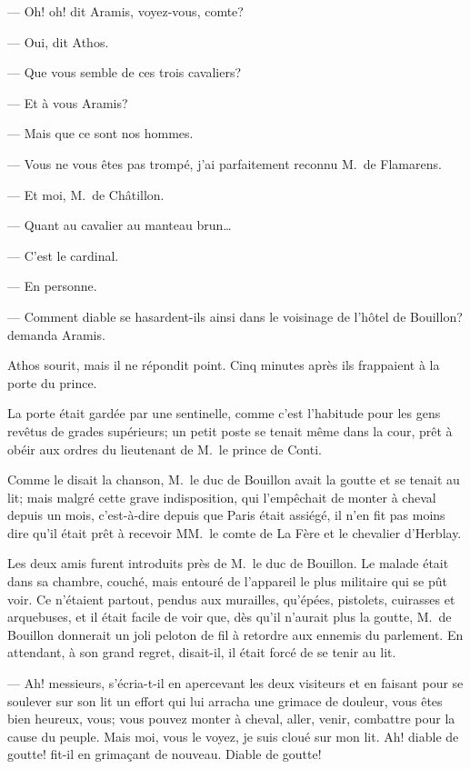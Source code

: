 — Oh! oh! dit Aramis, voyez-vous, comte?

— Oui, dit Athos.

— Que vous semble de ces trois cavaliers?

— Et à vous Aramis?

— Mais que ce sont nos hommes.

— Vous ne vous êtes pas trompé, j'ai parfaitement reconnu M.~de Flamarens.

— Et moi, M.~de Châtillon.

— Quant au cavalier au manteau brun\dots

— C'est le cardinal.

— En personne.

— Comment diable se hasardent-ils ainsi dans le voisinage de l'hôtel de Bouillon? demanda Aramis.

Athos sourit, mais il ne répondit point. Cinq minutes après ils frappaient à la porte du prince.

La porte était gardée par une sentinelle, comme c'est l'habitude pour les gens revêtus de grades supérieurs; un petit poste se tenait même dans la cour, prêt à obéir aux ordres du lieutenant de M.~le prince de Conti.

Comme le disait la chanson, M.~le duc de Bouillon avait la goutte et se tenait au lit; mais malgré cette grave indisposition, qui l'empêchait de monter à cheval depuis un mois, c'est-à-dire depuis que Paris était assiégé, il n'en fit pas moins dire qu'il était prêt à recevoir MM.~le comte de La Fère et le chevalier d'Herblay.

Les deux amis furent introduits près de M.~le duc de Bouillon. Le malade était dans sa chambre, couché, mais entouré de l'appareil le plus militaire qui se pût voir. Ce n'étaient partout, pendus aux murailles, qu'épées, pistolets, cuirasses et arquebuses, et il était facile de voir que, dès qu'il n'aurait plus la goutte, M.~de Bouillon donnerait un joli peloton de fil à retordre aux ennemis du parlement. En attendant, à son grand regret, disait-il, il était forcé de se tenir au lit.

— Ah! messieurs, s'écria-t-il en apercevant les deux visiteurs et en faisant pour se soulever sur son lit un effort qui lui arracha une grimace de douleur, vous êtes bien heureux, vous; vous pouvez monter à cheval, aller, venir, combattre pour la cause du peuple. Mais moi, vous le voyez, je suis cloué sur mon lit. Ah! diable de goutte! fit-il en grimaçant de nouveau. Diable de goutte!

